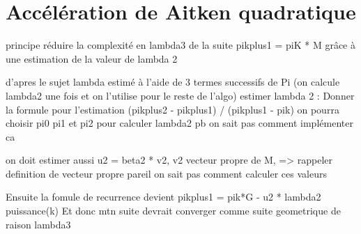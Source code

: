 \section{Accélération de Aitken quadratique}

	principe réduire la complexité en lambda3 de la suite pikplus1 = piK * M grâce à une estimation de la valeur de lambda 2
		
	
	d'apres le sujet lambda estimé à l'aide de 3 termes successifs de Pi (on calcule lambda2 une fois et on l'utilise pour le reste de l'algo)
	estimer lambda 2 : Donner la formule pour l'estimation  (pikplus2 - pikplus1) / (pikplus1 - pik) on pourra choisir pi0 pi1 et pi2 pour calculer lambda2
		pb on sait pas comment implémenter ca
	
	on doit estimer aussi u2 = beta2 * v2, v2 vecteur propre de M, => rappeler definition de vecteur propre
		pareil on sait pas comment calculer ces valeurs
		
	Ensuite la fomule de recurrence devient pikplus1 = pik*G - u2 * lambda2 puissance(k)
	Et donc mtn suite devrait converger comme suite geometrique de raison lambda3
	

